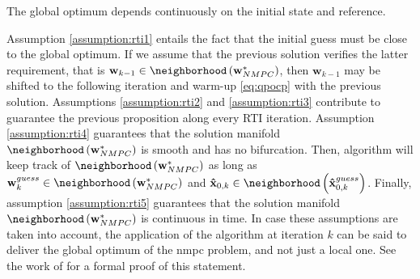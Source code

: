 \begin{assumption}\label{assumption:rti5}
The global optimum depends continuously on the initial state and reference.
\end{assumption}

Assumption \ref{assumption:rti1} entails the fact that the initial guess must be close to the global optimum. If we assume that the previous solution verifies the latter requirement, that is $\mathbf{w}_{k-1} \in \neighborhood\left( \mathbf{w}_{NMPC}^* \right)$, then $\mathbf{w}_{k-1}$ may be shifted to the following iteration and warm-up \ref{eq:qpocp} with the previous solution. Assumptions \ref{assumption:rti2} and \ref{assumption:rti3} contribute to guarantee the previous proposition along every RTI iteration. Assumption \ref{assumption:rti4} guarantees that the solution manifold $\neighborhood\left(\mathbf{w}_{NMPC}^*\right)$ is smooth and has no bifurcation. Then, algorithm  \cite{gros2020linear} will keep track of $\neighborhood\left( \mathbf{w}_{NMPC}^* \right)$ as long as $\mathbf{w}_{k}^{guess} \in \neighborhood\left( \mathbf{w}_{NMPC}^* \right)$ and $\mathbf{\hat{x}}_{0, k} \in \neighborhood\left( \mathbf{\hat{x}}_{0, k}^{guess}\right)$. Finally, assumption \ref{assumption:rti5} guarantees that the solution manifold $\neighborhood\left( \mathbf{w}_{NMPC}^* \right)$ is continuous in time. In case these assumptions are taken into account, the application of the  algorithm at iteration $k$ can be said to deliver the global optimum of the \acrshort{nmpc} problem, and not just a local one. See the work of \citet{diehl2001real} for a formal proof of this statement.

